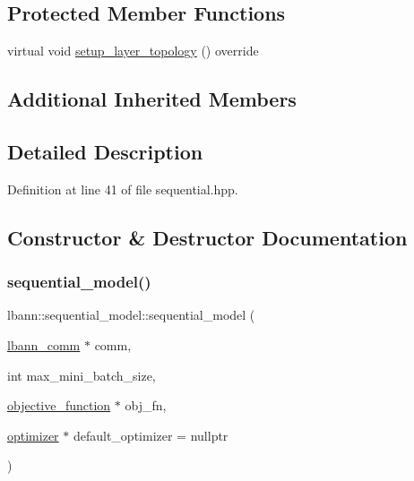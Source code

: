 \subsection*{Protected Member Functions}
\begin{DoxyCompactItemize}
\item 
virtual void \hyperlink{classlbann_1_1sequential__model_a3801a58530388fb6a8cb3e1c018e827d}{setup\+\_\+layer\+\_\+topology} () override
\end{DoxyCompactItemize}
\subsection*{Additional Inherited Members}


\subsection{Detailed Description}


Definition at line 41 of file sequential.\+hpp.



\subsection{Constructor \& Destructor Documentation}
\mbox{\label{classlbann_1_1sequential__model_a269f246d881186f8e8608dc4758cc6a6}} 
\subsubsection{\texorpdfstring{sequential\+\_\+model()}{sequential\_model()}\hspace{0.1cm}{\footnotesize\ttfamily [1/2]}}
{\footnotesize\ttfamily lbann\+::sequential\+\_\+model\+::sequential\+\_\+model (\begin{DoxyParamCaption}\item[{\hyperlink{classlbann_1_1lbann__comm}{lbann\+\_\+comm} $\ast$}]{comm,  }\item[{int}]{max\+\_\+mini\+\_\+batch\+\_\+size,  }\item[{\hyperlink{classlbann_1_1objective__function}{objective\+\_\+function} $\ast$}]{obj\+\_\+fn,  }\item[{\hyperlink{classlbann_1_1optimizer}{optimizer} $\ast$}]{default\+\_\+optimizer = {\ttfamily nullptr} }\end{DoxyParamCaption})}

